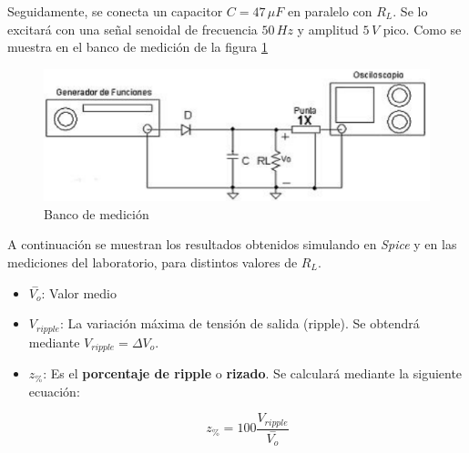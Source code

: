 \documentclass[10pt,spanish,a4paper,openany,notitlepage]{article}
\begin{document}
Seguidamente, se conecta un capacitor $C = 47\,\unit{\mu F}$ en paralelo con $R_L$. Se lo
excitará con una señal senoidal de frecuencia $50\,\unit{Hz}$ y amplitud $5\,\unit{V}$ pico.
Como se muestra en el banco de medición de la figura \ref{fig:rect_banco_C}

\begin{figure}[H]
\centering
\includegraphics[scale=0.6]{circuitos/Fconcap.png}
\caption{Banco de medición}
\label{fig:rect_banco_C}
\end{figure}


A continuación se muestran los resultados obtenidos simulando en \emph{Spice}
y en las mediciones del laboratorio, para distintos valores de $R_L$.


\begin{itemize}
    \item $\overset{-}{V_o}$: Valor medio 
    \item $V_{ripple}$: La variación máxima de tensión de salida (ripple).
    Se obtendrá mediante $V_{ripple} = \Delta V_o$. 
    \item $z_{\%}$: Es el \textbf{porcentaje de ripple} o \textbf{rizado}.
    Se calculará mediante la siguiente ecuación:

    \begin{equation}
        z_{\%} = 100 \frac{V_{ripple}}{\overset{-}{V_o}}
        \label{eq:z_ripple}
    \end{equation}

\end{itemize}
\end{document}
